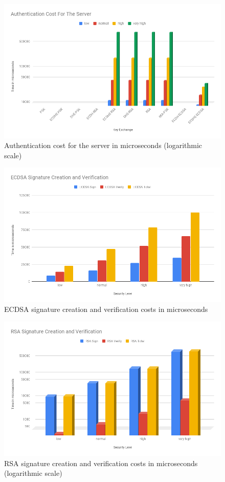 				  \begin{figure}
					\centering
					\includegraphics[width=1.0\textwidth]{img/papi-server-auth-cost.png}
					\centering \caption{Authentication cost for the server in microseconds (logarithmic scale)}
				  \end{figure}
  
				  \begin{figure}
					\centering
					\includegraphics[width=1.0\textwidth]{img/papi-ecdsa-sign-verify.png}
					\centering \caption{ECDSA signature creation and verification costs in microseconds}
				  \end{figure}
  
				  \begin{figure}
					\centering
					\includegraphics[width=1.0\textwidth]{img/papi-rsa-sign-verify.png}
					\centering \caption{RSA signature creation and verification costs in microseconds (logarithmic scale)}
				  \end{figure}
  

